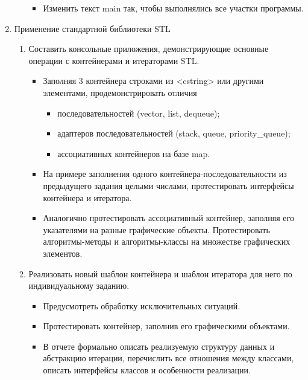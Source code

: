 \documentclass[a4paper, 14pt]{extarticle}
\begin{document}
\begin{enumerate}
\begin{enumerate}
\begin{itemize}
            \item Изменить текст main так, чтобы выполнялись все участки программы.
        \end{itemize}
    \end{enumerate}
    \item Применение стандартной библиотеки STL
    \begin{enumerate}
        \item Составить консольные приложения, демонстрирующие основные операции с контейнерами и итераторами STL.\@
        \begin{itemize}
            \item Заполняя 3 контейнера строками из <cstring> или другими элементами, продемонстрировать отличия
            \begin{itemize}
                \item последовательностей (vector, list, dequeue);
                \item адаптеров последовательностей (stack, queue, priority\_queue);
                \item ассоциативных контейнеров на базе map.
            \end{itemize}
            \item На примере заполнения одного контейнера-последовательности из предыдущего задания целыми числами, протестировать интерфейсы контейнера и итератора.
            \item Аналогично протестировать ассоциативный контейнер, заполняя его указателями на разные графические объекты. Протестировать алгоритмы-методы и алгоритмы-классы на множестве графических элементов.
        \end{itemize}
        \item Реализовать новый шаблон контейнера и шаблон итератора для него по индивидуальному заданию.
        \begin{itemize}
            \item Предусмотреть обработку исключительных ситуаций.
            \item Протестировать контейнер, заполнив его графическими объектами.
            \item В отчете формально описать реализуемую структуру данных и абстракцию итерации, перечислить все отношения между классами, описать интерфейсы классов и особенности реализации.
        \end{itemize}
    \end{enumerate}
\end{enumerate}
\end{document}

